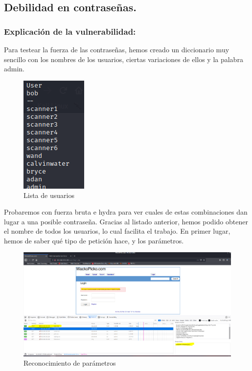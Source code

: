 \documentclass[12pt,twoside]{article}
\begin{document}
\subsection{Debilidad en contraseñas.}
\subsubsection*{Explicación de la vulnerabilidad:}
Para testear la fuerza de las contraseñas, hemos creado un diccionario muy sencillo con los nombres de los usuarios, ciertas variaciones de ellos y la palabra admin. 
\begin{figure}[H]
    \centering
    \includegraphics[scale=0.7]{./imagenes/usuarios_hydra}
    \caption{Lista de usuarios}
\end{figure}
Probaremos con fuerza bruta e hydra para ver cuales de estas combinaciones dan lugar a una posible contraseña. Gracias al listado anterior, hemos podido obtener el nombre de todos los usuarios, lo cual facilita el trabajo. 
En primer lugar, hemos de saber qué tipo de petición hace, y los parámetros.
\begin{figure}[H]
    \centering
    \includegraphics[scale=0.3]{./imagenes/hydra_1}
    \caption{Reconocimiento de parámetros}
\end{figure}
\end{document}

